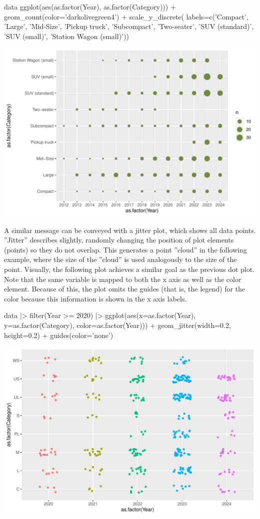 \begin{Rcode}
data %
ggplot(aes(as.factor(Year), as.factor(Category))) +
    geom_count(color='darkolivegreen4') +
    scale_y_discrete(
      labels=c('Compact', 'Large', 'Mid-Size', 'Pickup truck', 
               'Subcompact', 'Two-seater', 'SUV (standard)', 
               'SUV (small)', 'Station Wagon (small)'))
\end{Rcode}

\begin{center}
  \includegraphics[width=.8\textwidth]{fuel.count.pdf}
\end{center}

A similar message can be conveyed with a jitter plot, which shows all data points. ''Jitter'' describes slightly, randomly changing the position of plot elements (points) so they do not overlap. This generates a point ''cloud'' in the following example, where the size of the ''cloud'' is used analogously to the size of the point. Visually, the following plot achieves a similar goal as the previous dot plot. Note that the same variable is mapped to both the x axis as well as the color element. Because of this, the plot omits the guides (that is, the legend) for the color because this information is shown in the x axis labels.

\begin{Rcode}
data |> 
  filter(Year >= 2020) |>
  ggplot(aes(x=as.factor(Year), y=as.factor(Category), 
             color=as.factor(Year))) +
    geom_jitter(width=0.2, height=0.2) +
    guides(color='none')
\end{Rcode}

\begin{center}
  \includegraphics[width=.8\textwidth]{fuel.jitterdiscrete.pdf}
\end{center}

